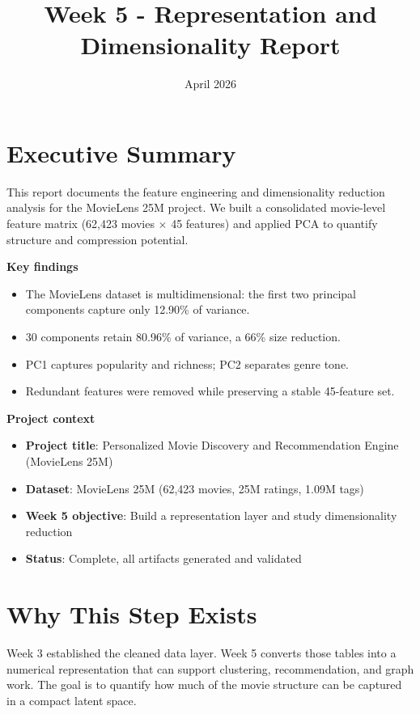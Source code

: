 \documentclass[11pt]{article}
\title{Week 5 - Representation and Dimensionality Report}
\date{April 2026}
\begin{document}
\maketitle

\section{Executive Summary}

This report documents the feature engineering and dimensionality reduction analysis for the MovieLens 25M project. We built a consolidated movie-level feature matrix (62,423 movies \(\times\) 45 features) and applied PCA to quantify structure and compression potential.

\textbf{Key findings}

\begin{itemize}[leftmargin=1.5em]
    \item The MovieLens dataset is multidimensional: the first two principal components capture only 12.90\% of variance.
    \item 30 components retain 80.96\% of variance, a 66\% size reduction.
    \item PC1 captures popularity and richness; PC2 separates genre tone.
    \item Redundant features were removed while preserving a stable 45-feature set.
\end{itemize}

\textbf{Project context}

\begin{itemize}[leftmargin=1.5em]
    \item \textbf{Project title}: Personalized Movie Discovery and Recommendation Engine (MovieLens 25M)
    \item \textbf{Dataset}: MovieLens 25M (62,423 movies, 25M ratings, 1.09M tags)
    \item \textbf{Week 5 objective}: Build a representation layer and study dimensionality reduction
    \item \textbf{Status}: Complete, all artifacts generated and validated
\end{itemize}

\section{Why This Step Exists}

Week 3 established the cleaned data layer. Week 5 converts those tables into a numerical representation that can support clustering, recommendation, and graph work. The goal is to quantify how much of the movie structure can be captured in a compact latent space.
\end{document}
